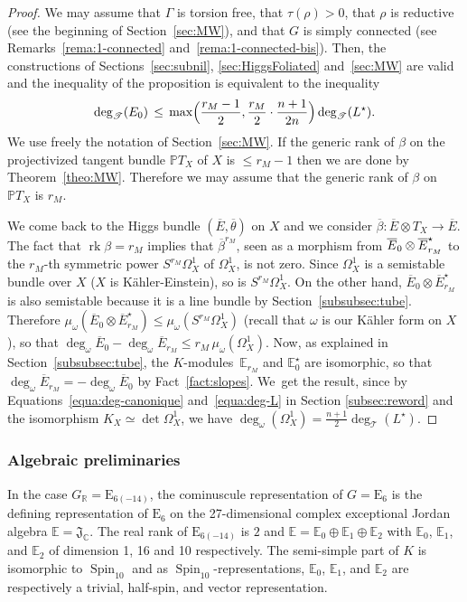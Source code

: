 \documentclass[JEP,XML,SOM,Unicode,NoFloatCountersInSection]{cedram}
\let\mathcal\mathscr
\theoremstyle{plain}
\theoremstyle{definition}
\let\ov\overline
\DeclareMathOperator{\rk}{rk}
\DeclareMathOperator{\Spin}{Spin}
\newcommand{\cT}{\mathcal{T}}
\newcommand{\bC}{\mathbb{C}}
\newcommand{\bE}{\mathbb{E}}
\newcommand{\bR}{\mathbb{R}}
\newcommand{\PTX}{{\mathbb{P}T_X}}
\newcommand{\fJ}{\mathfrak{J}}
\newcommand{\rkm}{{r_M}}
\newcommand{\ovE}{\ov{E}}
\newcommand{\ovb}{\ov{\beta}}
\newcommand{\ovt}{\ov{\theta}}
\begin{document}
\begin{proof}
We may assume that $\Gamma$ is torsion free, that $\tau(\rho)>0$, that $\rho$
is reductive (see the beginning of Section~\ref{sec:MW}), and that $G$ is simply connected (see
Remarks~\ref{rema:1-connected} and~\ref{rema:1-connected-bis}). Then, the constructions of
Sections~\ref{sec:subnil}, \ref{sec:HiggsFoliated} and~\ref{sec:MW}
are valid and the inequality of the proposition is equivalent to the inequality
$$
\deg_\cT(E_0) \,\leq\,
\max\Bigl({\frac{\rkm-1}{2},\frac {\rkm}{2} \cdot \frac{n+1}{2n}} \Bigr) \deg_\cT(L^\star).
$$
We use freely the notation of Section~\ref{sec:MW}. If the generic rank of $\beta$ on the
projectivized tangent bundle $\PTX$
of $X$ is $\leq \rkm-1$ then we are done by Theorem~\ref{theo:MW}. Therefore we may assume that the
generic rank of $\beta$ on $\PTX$ is $\rkm$.

We come back to the Higgs bundle $(\ovE,\ovt)$ on $X$ and we consider \hbox{$\ovb:\ovE\otimes T_X\to\ovE$}. The fact that $\rk\beta=\rkm$ implies that $\ovb^\rkm$, seen as a morphism from
$\ovE_0\otimes\nobreak\ovE_\rkm^\star$ to the $\rkm$-th symmetric power $S^\rkm\Omega^1_X$ of $\Omega^1_X$, is not
zero. Since $\Omega^1_X$ is a semi\-stable bundle
over $X$ ($X$ is Kähler-Einstein), so is $S^\rkm\Omega^1_X$. On the other hand,
$\ovE_0\otimes\ovE_\rkm^\star$ is also semistable
because it is a line bundle by Section~\ref{subsubsec:tube}.
Therefore \hbox{$\mu_\omega(\ovE_0\otimes\ovE_\rkm^\star)\leq \mu_\omega(S^\rkm\Omega^1_X)$}
(recall that $\omega$ is our Kähler form on $X$),
so that $\deg_\omega \ovE_0-\deg_\omega \ovE_\rkm\leq \rkm\,\mu_\omega(\Omega^1_X)$. Now, as explained in
Section~\ref{subsubsec:tube}, the $K$\nobreakdash-mod\-ules~$\bE_\rkm$ and $\bE_0^\star$ are isomorphic, so that $\deg_\omega \ovE_\rkm=-\deg_\omega \ovE_0$
by Fact~\ref{fact:slopes}.
We~get the result, since by Equations~\eqref{equa:deg-canonique} and~\eqref{equa:deg-L}
in Section \ref{subsec:reword}
and the isomorphism $K_X \simeq \det \Omega^1_X$, we have
$\deg_\omega(\Omega^1_X)=\frac{n+1}{2}\deg_\cT(L^\star)$.
\end{proof}

\label{subsec:E6}

\subsubsection{Algebraic preliminaries}

In the case $G_\bR=\mathrm{E}_{6(-14)}$, the cominuscule
representation of $G=\mathrm{E}_6$ is the defining
representation of ${\mathrm{E}_6}$ on the 27-dimensional complex exceptional Jordan algebra $\bE=\fJ_\bC$.
The real rank of $\mathrm{E}_{6(-14)}$ is $2$ and $\bE=\bE_0\oplus\bE_1\oplus\bE_2$ with $\bE_0$, $\bE_1$,
and $\bE_2$ of dimension 1, 16 and 10 respectively. The semi-simple part of $K$ is isomorphic to
$\Spin_{10}$ and as $\Spin_{10}$-representations, $\bE_0$, $\bE_1$, and $\bE_2$ are respectively a
trivial, half-spin, and vector representation.
\end{document}
